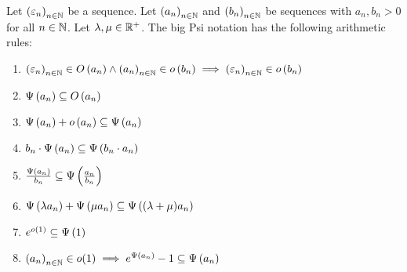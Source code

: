 \begin{theorem} \label{thm:bigpsi:rules}
  Let $\left({\varepsilon_n}\right)_{{n}\in\mathbb N}$ be a sequence. Let $\left({a_n}\right)_{{n}\in\mathbb N}$ and $\left({b_n}\right)_{{n}\in\mathbb N}$ be sequences with $a_n,b_n > 0$ for all $n\in\mathbb N$. Let $\lambda, \mu \in \mathbb R^{+}$. The big Psi notation has the following arithmetic rules:

  \begin{enumerate}
    \item $\left({\varepsilon_n}\right)_{{n}\in\mathbb N} \in O\left( {a_n} \right) \land \left({a_n}\right)_{{n}\in\mathbb N} \in o\left( {b_n} \right) \implies \left({\varepsilon_n}\right)_{{n}\in\mathbb N} \in o\left( {b_n} \right)$
    \item $\Psi\left( {a_n} \right) \subseteq O\left( {a_n} \right)$
    \item $\Psi\left( {a_n} \right) + o\left( {a_n} \right) \subseteq \Psi\left( {a_n} \right)$
    \item $b_n \cdot \Psi\left( {a_n} \right) \subseteq \Psi\left( {b_n \cdot a_n} \right)$
    \item $\frac{\Psi\left( {a_n} \right)}{b_n} \subseteq \Psi\left( {\frac{a_n}{b_n}} \right)$
    \item $\Psi\left( {\lambda a_n} \right) + \Psi\left( {\mu a_n} \right) \subseteq \Psi\left( {(\lambda+\mu)a_n} \right)$
    \item $e^{o\left( {1} \right)} \subseteq \Psi\left( {1} \right)$
    \item $\left({a_n}\right)_{{n}\in\mathbb N} \in o(1) \implies e^{\Psi\left( {a_n} \right)}-1 \subseteq \Psi\left( {a_n} \right)$
  \end{enumerate}
\end{theorem}
